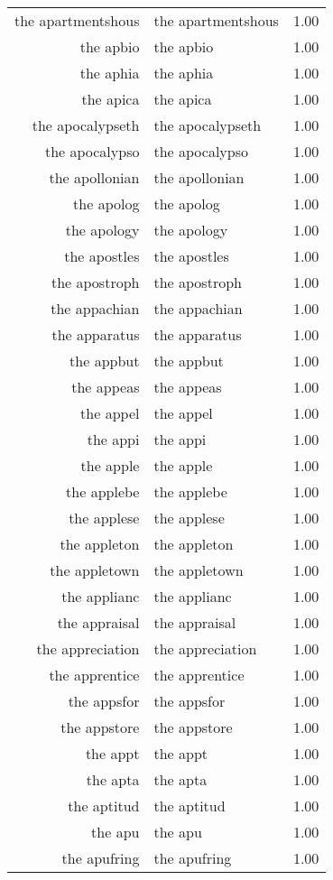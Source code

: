 \begin{table}[ht]
\begin{tabular}{rlr}
  the apartmentshous & the apartmentshous & 1.00 \\ 
  the apbio & the apbio & 1.00 \\ 
  the aphia & the aphia & 1.00 \\ 
  the apica & the apica & 1.00 \\ 
  the apocalypseth & the apocalypseth & 1.00 \\ 
  the apocalypso & the apocalypso & 1.00 \\ 
  the apollonian & the apollonian & 1.00 \\ 
  the apolog & the apolog & 1.00 \\ 
  the apology & the apology & 1.00 \\ 
  the apostles & the apostles & 1.00 \\ 
  the apostroph & the apostroph & 1.00 \\ 
  the appachian & the appachian & 1.00 \\ 
  the apparatus & the apparatus & 1.00 \\ 
  the appbut & the appbut & 1.00 \\ 
  the appeas & the appeas & 1.00 \\ 
  the appel & the appel & 1.00 \\ 
  the appi & the appi & 1.00 \\ 
  the apple & the apple & 1.00 \\ 
  the applebe & the applebe & 1.00 \\ 
  the applese & the applese & 1.00 \\ 
  the appleton & the appleton & 1.00 \\ 
  the appletown & the appletown & 1.00 \\ 
  the applianc & the applianc & 1.00 \\ 
  the appraisal & the appraisal & 1.00 \\ 
  the appreciation & the appreciation & 1.00 \\ 
  the apprentice & the apprentice & 1.00 \\ 
  the appsfor & the appsfor & 1.00 \\ 
  the appstore & the appstore & 1.00 \\ 
  the appt & the appt & 1.00 \\ 
  the apta & the apta & 1.00 \\ 
  the aptitud & the aptitud & 1.00 \\ 
  the apu & the apu & 1.00 \\ 
  the apufring & the apufring & 1.00 \\ 

\end{tabular}
\end{table}
